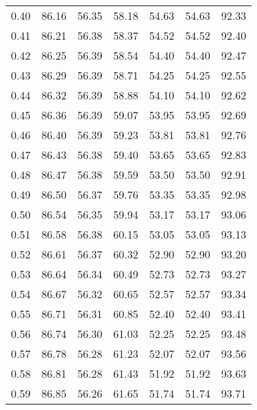 \begin{tabular}{|c|c|c|c|c|c|c|}
      0.40 &     86.16 &     56.35 &      58.18 &   54.63 &      54.63 &         92.33 \\
      0.41 &     86.21 &     56.38 &      58.37 &   54.52 &      54.52 &         92.40 \\
      0.42 &     86.25 &     56.39 &      58.54 &   54.40 &      54.40 &         92.47 \\
      0.43 &     86.29 &     56.39 &      58.71 &   54.25 &      54.25 &         92.55 \\
      0.44 &     86.32 &     56.39 &      58.88 &   54.10 &      54.10 &         92.62 \\
      0.45 &     86.36 &     56.39 &      59.07 &   53.95 &      53.95 &         92.69 \\
      0.46 &     86.40 &     56.39 &      59.23 &   53.81 &      53.81 &         92.76 \\
      0.47 &     86.43 &     56.38 &      59.40 &   53.65 &      53.65 &         92.83 \\
      0.48 &     86.47 &     56.38 &      59.59 &   53.50 &      53.50 &         92.91 \\
      0.49 &     86.50 &     56.37 &      59.76 &   53.35 &      53.35 &         92.98 \\
      0.50 &     86.54 &     56.35 &      59.94 &   53.17 &      53.17 &         93.06 \\
      0.51 &     86.58 &     56.38 &      60.15 &   53.05 &      53.05 &         93.13 \\
      0.52 &     86.61 &     56.37 &      60.32 &   52.90 &      52.90 &         93.20 \\
      0.53 &     86.64 &     56.34 &      60.49 &   52.73 &      52.73 &         93.27 \\
      0.54 &     86.67 &     56.32 &      60.65 &   52.57 &      52.57 &         93.34 \\
      0.55 &     86.71 &     56.31 &      60.85 &   52.40 &      52.40 &         93.41 \\
      0.56 &     86.74 &     56.30 &      61.03 &   52.25 &      52.25 &         93.48 \\
      0.57 &     86.78 &     56.28 &      61.23 &   52.07 &      52.07 &         93.56 \\
      0.58 &     86.81 &     56.28 &      61.43 &   51.92 &      51.92 &         93.63 \\
      0.59 &     86.85 &     56.26 &      61.65 &   51.74 &      51.74 &         93.71 \\

\end{tabular}
